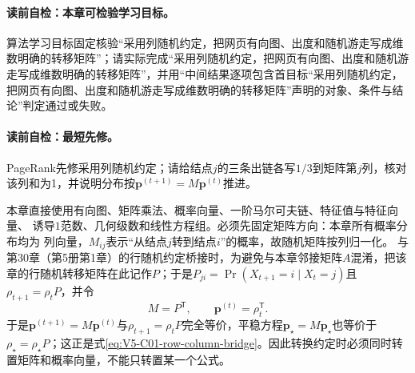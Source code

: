 \label{struct:V5-C07-CH01}
\paragraph{读前自检：本章可检验学习目标。}\PageRank{} 算法学习目标固定核验“采用列随机约定，把网页有向图、出度和随机游走写成维数明确的转移矩阵”；请实际完成“采用列随机约定，把网页有向图、出度和随机游走写成维数明确的转移矩阵”，并用“中间结果逐项包含首目标“采用列随机约定，把网页有向图、出度和随机游走写成维数明确的转移矩阵”声明的对象、条件与结论”判定通过或失败。\par


\label{struct:V5-C07-CH02}
\paragraph{读前自检：最短先修。}PageRank先修采用列随机约定；请给结点$j$的三条出链各写$1/3$到矩阵第$j$列，核对该列和为1，并说明分布按$\boldsymbol p^{(t+1)}=M\boldsymbol p^{(t)}$推进。\par

\begin{prerequisitebox}
本章直接使用有向图、矩阵乘法、概率向量、一阶马尔可夫链、特征值与特征向量、
诱导$1$范数、几何级数和线性方程组。必须先固定矩阵方向：本章所有概率分布均为
列向量，$M_{ij}$表示“从结点$j$转到结点$i$”的概率，故随机矩阵按列归一化。
与第30章（第5册第1章）的行随机约定桥接时，为避免与本章邻接矩阵$A$混淆，把该章的行随机转移矩阵在此记作$P$；于是$P_{ji}=\Pr(X_{t+1}=i\mid X_t=j)$且$\rho_{t+1}=\rho_tP$，并令
\[
M=P^{\mathsf T},\qquad \boldsymbol p^{(t)}=\rho_t^{\mathsf T}.
\]
于是$\boldsymbol p^{(t+1)}=M\boldsymbol p^{(t)}$与$\rho_{t+1}=\rho_tP$完全等价，平稳方程$\boldsymbol p_\star=M\boldsymbol p_\star$也等价于$\rho_\star=\rho_\star P$；这正是式\eqref{eq:V5-C01-row-column-bridge}。因此转换约定时必须同时转置矩阵和概率向量，不能只转置某一个公式。
\end{prerequisitebox}

